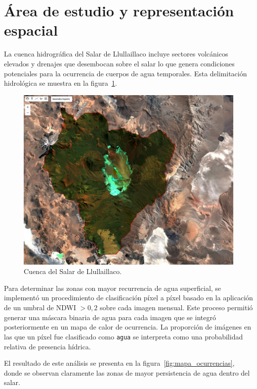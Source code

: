 \section{Área de estudio y representación espacial}

La cuenca hidrográfica del  Salar de Llullaillaco incluye sectores volcánicos elevados y drenajes que desembocan sobre el salar lo que genera condiciones potenciales para la ocurrencia de cuerpos de agua temporales. Esta delimitación hidrológica se muestra en la figura~\ref{fig:cuenca_llullaillaco}.


\begin{figure}[htpb]
	\centering
	\includegraphics[scale=.3]{Figures/fig5.png}
	\caption{Cuenca del Salar de Llullaillaco.}
	\label{fig:cuenca_llullaillaco}
\end{figure}

Para determinar las zonas con mayor recurrencia de agua superficial, se implementó un procedimiento de clasificación píxel a píxel basado en la aplicación de un umbral de NDWI $>0{,}2$ sobre cada imagen mensual. Este proceso permitió generar una máscara binaria de agua para cada imagen que se integró posteriormente en un mapa de calor de ocurrencia. La proporción de imágenes en las que un píxel fue clasificado como \texttt{agua} se interpreta como una probabilidad relativa de presencia hídrica.

El resultado de este análisis se presenta en la figura~\ref{fig:mapa_ocurrencias}, donde se observan claramente las zonas de mayor persistencia de agua dentro del salar.


